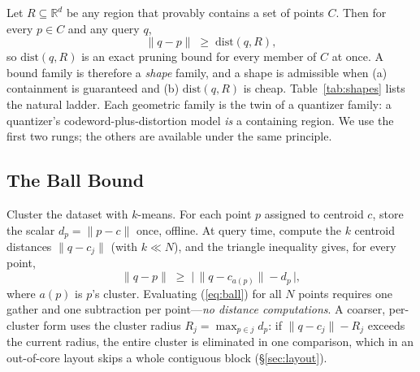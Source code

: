 \documentclass[sigconf, nonacm]{acmart}
\begin{document}
Let $R \subseteq \mathbb{R}^d$ be any region that provably contains a set of
points $C$. Then for every $p \in C$ and any query $q$,
\begin{equation}
\lVert q - p \rVert \;\ge\; \mathrm{dist}(q, R),
\end{equation}
so $\mathrm{dist}(q,R)$ is an exact pruning bound for every member of $C$
at once. A bound family is therefore a \emph{shape} family, and a shape is
admissible when (a) containment is guaranteed and (b) $\mathrm{dist}(q,R)$
is cheap. Table~\ref{tab:shapes} lists the natural ladder. Each geometric
family is the twin of a quantizer family: a quantizer's
codeword-plus-distortion model \emph{is} a containing region. We use the
first two rungs; the others are available under the same principle.

\begin{table}[t]
\caption{Shape families and their exact bounds. Each is tight for a
different data structure; each mirrors a quantizer family.}
\label{tab:shapes}
\small
{}
\end{table}

\subsection{The Ball Bound}

Cluster the dataset with $k$-means. For each point $p$ assigned to centroid
$c$, store the scalar $d_p = \lVert p - c \rVert$ once, offline. At query
time, compute the $k$ centroid distances $\lVert q - c_j \rVert$ (with
$k \ll N$), and the triangle inequality gives, for every point,
\begin{equation}
\label{eq:ball}
\lVert q - p \rVert \;\ge\; \bigl|\, \lVert q - c_{a(p)} \rVert - d_p \,\bigr|,
\end{equation}
where $a(p)$ is $p$'s cluster. Evaluating (\ref{eq:ball}) for all $N$ points
requires one gather and one subtraction per point---\emph{no distance
computations}. A coarser, per-cluster form uses the cluster radius
$R_j = \max_{p \in j} d_p$: if $\lVert q - c_j \rVert - R_j$ exceeds the
current radius, the entire cluster is eliminated in one comparison, which in
an out-of-core layout skips a whole contiguous block (\S\ref{sec:layout}).
\end{document}
